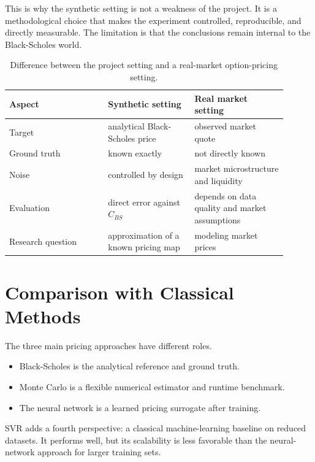 This is why the synthetic setting is not a weakness of the project.
It is a methodological choice that makes the experiment controlled, reproducible, and directly measurable.
The limitation is that the conclusions remain internal to the Black-Scholes world.

\begin{table}[H]
    \centering
    \begin{tabular}{
        >{\raggedright\arraybackslash}p{0.32\linewidth}
        >{\raggedright\arraybackslash}p{0.28\linewidth}
        >{\raggedright\arraybackslash}p{0.30\linewidth}
        }
        \toprule
        Aspect            & Synthetic setting                    & Real market setting                            \\
        \midrule
        Target            & analytical Black-Scholes price       & observed market quote                          \\
        \projecttablerowsep
        Ground truth      & known exactly                        & not directly known                             \\
        \projecttablerowsep
        Noise             & controlled by design                 & market microstructure and liquidity            \\
        \projecttablerowsep
        Evaluation        & direct error against $C_{BS}$        & depends on data quality and market assumptions \\
        \projecttablerowsep
        Research question & approximation of a known pricing map & modeling market prices                         \\
        \bottomrule
    \end{tabular}
    \caption{Difference between the project setting and a real-market option-pricing setting.}
    \label{tab:synthetic-vs-real-discussion}
\end{table}

\section{Comparison with Classical Methods}

The three main pricing approaches have different roles.

\begin{itemize}
    \item Black-Scholes is the analytical reference and ground truth.
    \item Monte Carlo is a flexible numerical estimator and runtime benchmark.
    \item The neural network is a learned pricing surrogate after training.
\end{itemize}
SVR adds a fourth perspective: a classical machine-learning baseline on reduced datasets.
It performs well, but its scalability is less favorable than the neural-network approach for larger training sets.

